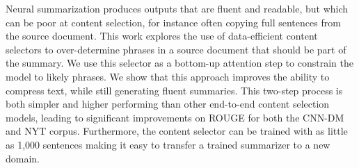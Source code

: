 Neural summarization produces outputs that are fluent and readable, but which can be poor at content selection, for instance often copying full sentences from the source document. This work explores the use of data-efficient content selectors to over-determine phrases in a source document that should be part of the summary. We use this selector as a bottom-up attention step to constrain the model to likely phrases. We show that this approach improves the ability to compress text, while still generating fluent summaries. This two-step process is both simpler and higher performing than other end-to-end content selection models, leading to significant improvements on ROUGE for both the  CNN-DM and NYT corpus. Furthermore, the content selector can be trained with as little as 1,000 sentences making it easy to transfer a trained summarizer to a new domain.
